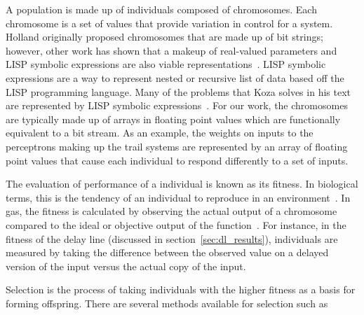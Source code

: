 A population is made up of individuals composed of chromosomes. Each chromosome is a set of values that provide variation in control for a system. Holland originally proposed chromosomes that are made up of bit strings; however, other work has shown that a makeup of real-valued parameters and LISP symbolic expressions are also viable representations~\cite{Baeck2000-co}. LISP symbolic expressions are a way to represent nested or recursive list of data based off the LISP programming language. Many of the problems that Koza solves in his text are represented by LISP symbolic expressions~\cite{Koza1992-xs}. For our work, the chromosomes are typically made up of arrays in floating point values which are functionally equivalent to a bit stream. As an example, the weights on inputs to the perceptrons making up the trail systems are represented by an array of floating point values that cause each individual to respond differently to a set of inputs.

The evaluation of performance of a individual is known as its fitness. In biological terms, this is the tendency of an individual to reproduce in an environment~\cite{Mitchell1998-tw}. In \Glspl{ga}, the fitness is calculated by observing the actual output of a chromosome compared to the ideal or objective output of the function~\cite{Baeck2000-co}. For instance, in the fitness of the delay line (discussed in section~\ref{sec:dl_results}), individuals are measured by taking the difference between the observed value on a delayed version of the input versus the actual copy of the input. 

Selection is the process of taking individuals with the higher fitness as a basis for forming offspring. There are several methods available for selection such as

